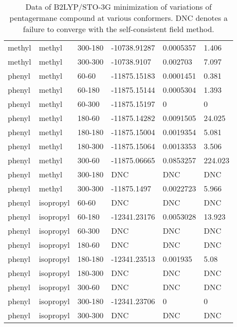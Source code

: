 \begin{table}[]
\begin{tabular}{llllll}
		methyl & methyl & 300-180 & -10738.91287 & 0.0005357 & 1.406 \\
		methyl & methyl & 300-300 & -10738.9107 & 0.002703 & 7.097 \\ \hline
		phenyl & methyl & 60-60 & -11875.15183 & 0.0001451 & 0.381 \\
		phenyl & methyl & 60-180 & -11875.15144 & 0.0005304 & 1.393 \\
		phenyl & methyl & 60-300 & -11875.15197 & 0 & 0 \\
		phenyl & methyl & 180-60 & -11875.14282 & 0.0091505 & 24.025 \\
		phenyl & methyl & 180-180 & -11875.15004 & 0.0019354 & 5.081 \\
		phenyl & methyl & 180-300 & -11875.15064 & 0.0013353 & 3.506 \\
		phenyl & methyl & 300-60 & -11875.06665 & 0.0853257 & 224.023 \\
		phenyl & methyl & 300-180 & DNC & DNC & DNC \\
		phenyl & methyl & 300-300 & -11875.1497 & 0.0022723 & 5.966 \\ \hline
		phenyl & isopropyl & 60-60 & DNC & DNC & DNC \\
		phenyl & isopropyl & 60-180 & -12341.23176 & 0.0053028 & 13.923 \\
		phenyl & isopropyl & 60-300 & DNC & DNC & DNC \\
		phenyl & isopropyl & 180-60 & DNC & DNC & DNC \\
		phenyl & isopropyl & 180-180 & -12341.23513 & 0.001935 & 5.08 \\
		phenyl & isopropyl & 180-300 & DNC & DNC & DNC \\
		phenyl & isopropyl & 300-60 & DNC & DNC & DNC \\
		phenyl & isopropyl & 300-180 & -12341.23706 & 0 & 0 \\
		phenyl & isopropyl & 300-300 & DNC & DNC & DNC
	\end{tabular}
	\caption{Data of B2LYP/STO-3G minimization of variations of pentagermane compound at various conformers. DNC denotes a failure to converge with the self-consistent field method.}
	\label{tab:Ge5Ver2Data}
\end{table}

